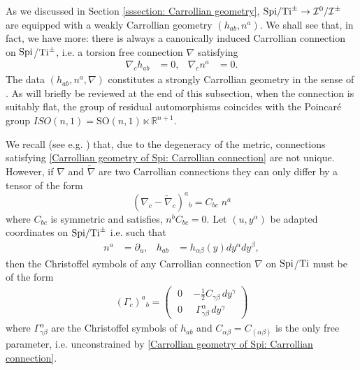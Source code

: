 \documentclass[a4paper, 10pt]{article}
\theoremstyle{remark}
\newcommand{\correc}[1]{#1}
\newcommand{\Ti}{\textnormal{Ti}}
\newcommand{\Spi}{\textnormal{Spi}}
\begin{document}
As we discussed in Section \ref{sssection: Carrollian geometry}, $\Spi/\Ti^{\pm} \to \mathcal{I}^0/\mathcal{I}^{\pm}$ are equipped with a weakly Carrollian geometry $(h_{ab}, n^a)$. We shall see that, in fact, we have more: there is always a canonically induced Carrollian connection on $\Spi$/$\Ti^{\pm}$, i.e. a torsion free connection $\nabla$ satisfying
\begin{align}\label{Carrollian geometry of Spi: Carrollian connection}
 \nabla_c h_{ab}& =0, & \nabla_c n^a&=0.
\end{align}
The data $(h_{ab}, n^a,\nabla)$ constitutes a strongly Carrollian geometry in the sense of \cite{duval_carroll_2014}. As will briefly be reviewed at the end of this subsection, when the connection is suitably flat, the group of residual automorphisms coincides with the Poincaré group $ISO(n,1) = \textrm{SO}(n,1) \ltimes \mathbb{R}^{n+1}$.

We recall (see e.g. \cite{bekaert_connections_2018,Herfray:2021qmp}) that, due to the degeneracy of the metric, connections satisfying \eqref{Carrollian geometry of Spi: Carrollian connection} are not unique. However, if $\nabla$ and $\tilde{\nabla}$ are two Carrollian connections they can only differ by a tensor of the form
\correc{\begin{equation}
   ( \nabla_c -\tilde{\nabla}_c )^a{}_b = C_{bc}\;n^a \label{Eq::Cfirst}
\end{equation}}
where $C_{bc}$ is symmetric and satisfies, $n^b C_{bc}=0$. Let $(u, y^{\alpha})$ be adapted coordinates on $\Spi/\Ti^{\pm}$ i.e. such that
\begin{align}
    n^a &= \partial_u, & h_{ab} &= h_{\alpha\beta}(y) dy^{\alpha} dy^{\beta},
\end{align}
then the Christoffel symbols of any Carrollian connection $\nabla$ on $\Spi$/$\Ti$ must be of the form
\begin{align}\label{Carrollian geometry of Spi: Carrollian connection coefficients}
   (\Gamma_{c})^a{}_b  = \begin{pmatrix}
        \;0\; & -\frac{1}{2}C_{\gamma\beta}\, dy^{\gamma} \\[0.2em]
        \;0\; & \; \Gamma^{\alpha}_{\gamma\beta}\, dy^{\gamma} 
    \end{pmatrix}
\end{align}
where $\Gamma_{\gamma\beta}^{\alpha}$ are the Christoffel symbols of $h_{ab}$ and $C_{\alpha\beta}=C_{(\alpha\beta)}$ is the only free parameter, i.e. unconstrained by \eqref{Carrollian geometry of Spi: Carrollian connection}.
\end{document}
